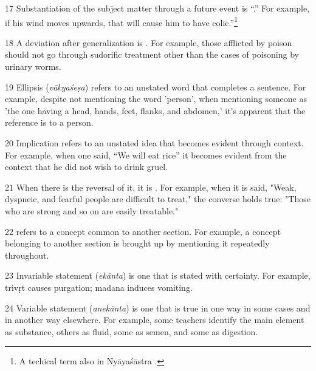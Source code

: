 \begin{translation}
\item [17] Substantiation of the subject matter through a future event is
“.” For example, if his wind moves upwards, that
will cause him to have colic.”\footnote{A techical term also in
    Nyāyaśāstra \citep[6--7]{jhal-1978}.}


\item [18] A deviation after generalization is . For example, those afflicted by poison should not go through sudorific treatment other than the cases of poisoning by urinary worms.

\item [19] Ellipsis (\emph{vākyaśeṣa}) refers to an 
unstated word that 
completes a sentence. For example, despite not mentioning the word 'person', 
when mentioning someone as 'the one having a head, hands, feet, flanks, and 
abdomen,' it's apparent that the reference is to a person. 

\item [20] Implication refers to an unstated idea 
that becomes evident through context. For example, when one said, “We will 
eat rice” it becomes evident from the context that he did not wish to drink 
gruel. 

\item [21] When there is the reversal of it, it is . 
For example, when it is said, "Weak, dyspneic, and fearful people are difficult to 
treat," the converse holds true: "Those who are strong and so on are easily 
treatable." 

\item [22]  refers to a concept common to another section. For example, a concept belonging to another section is brought up by mentioning it repeatedly throughout. 

\item [23] Invariable statement (\emph{ekānta}) is one that 
is stated with certainty. For example, \gls{trivṛt} causes purgation; 
\gls{madana} induces vomiting.

\item [24] Variable statement (\emph{anekānta}) is one that is true in one way in 
some cases and in another way elsewhere. For example, some teachers identify 
the main element as substance, others as fluid, some as semen, and some as 
digestion.


\end{translation}

